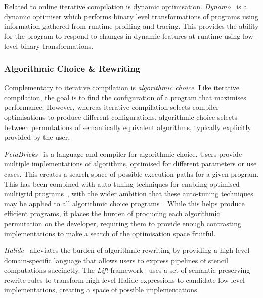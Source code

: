 Related to online iterative compilation is dynamic optimisation. \emph{Dynamo}~\cite{Bala2000} is a dynamic optimiser which performs binary level transformations of programs using information gathered from runtime profiling and tracing. This provides the ability for the program to respond to changes in dynamic features at runtime using low-level binary transformations.


\subsubsection{Algorithmic Choice \& Rewriting}

Complementary to iterative compilation is \emph{algorithmic choice}. Like iterative compilation, the goal is to find the configuration of a program that maximises performance. However, whereas iterative compilation selects compiler optimisations to produce different configurations, algorithmic choice selects between permutations of semantically equivalent algorithms, typically explicitly provided by the user.

\emph{PetaBricks}~\cite{Ansel2009a} is a language and compiler for algorithmic choice. Users provide multiple implementations of algorithms, optimised for different parameters or use cases. This creates a search space of possible execution paths for a given program. This has been combined with auto-tuning techniques for enabling optimised multigrid programs~\cite{Chan2009}, with the wider ambition that these auto-tuning techniques may be applied to all algorithmic choice programs~\cite{Ansel2014}. While this helps produce efficient programs, it places the burden of producing each algorithmic permutation on the developer, requiring them to provide enough contrasting implementations to make a search of the optimisation space fruitful.

\emph{Halide}~\cite{Ragan-Kelley2013} alleviates the burden of algorithmic rewriting by providing a high-level domain-specific language that allows users to express pipelines of stencil computations succinctly.
The \emph{Lift} framework~\cite{Steuwer2017} uses a set of semantic-preserving rewrite rules to transform high-level Halide expressions to candidate low-level implementations, creating a space of possible implementations.


